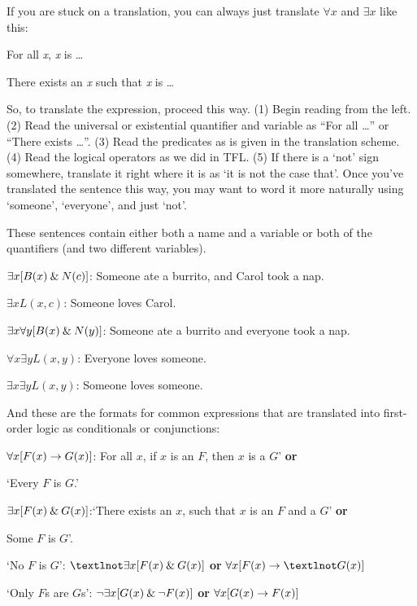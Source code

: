 If you are stuck on a translation, you can always just translate $\forall x$ and $\exists x$ like this:
\begin{ebullet}
\item[] For all \textit{x}, \textit{x} is \ldots
\item[] There exists an \textit{x} such that \textit{x} is \ldots
\end{ebullet} 
So, to translate the expression, proceed this way. (1) Begin reading from the left. (2) Read the universal or existential quantifier and variable as ``For all \ldots'' or ``There exists \ldots''. (3) Read the predicates as is given in the translation scheme. (4) Read the logical operators as we did in TFL. (5) If there is a `not' sign somewhere, translate it right where it is as `it is not the case that'. Once you've translated the sentence this way, you may want to word it more naturally using `someone', `everyone', and just `not'.

These sentences contain either both a name and a variable or both of the quantifiers (and two different variables).
\begin{ebullet}
	\item[]$\exists x[B(x) \mathbin{\&} N(c)]$: Someone ate a burrito, and Carol took a nap.\smallskip
	\item[]$\exists xL(x,c)$: Someone loves Carol.\smallskip
	\item[]$\exists x \forall y[B(x) \mathbin{\&} N(y)]$: Someone ate a burrito and everyone took a nap.\smallskip
	\item[]$\forall x \exists yL(x,y)$: Everyone loves someone.\smallskip
	\item[]$\exists x \exists yL(x,y)$: Someone loves someone.
\end{ebullet}
\noindent And these are the formats for common expressions that are translated into first-order logic as conditionals or conjunctions: 
\begin{ebullet}
\item[]$\forall x[F(x) \rightarrow G(x)]$: For all $x$, if $x$ is an $F$, then $x$ is a $G$’ \textbf{or}%
\item[]\hspace{29mm}`Every $F$ is $G$.’\smallskip
\item[]$\exists x[F(x) \mathbin{\&} G(x)]$:`There exists an $x$, such that $x$ is an $F$ and a $G$’ \textbf{or}%
\item[]\hspace{29mm} Some $F$ is $G$’.\smallskip
\item[]`No $F$ is $G$’: $¬\exists x[F(x) \eand G(x)] $ \textbf{or} $\forall x[F(x) \eif ¬G(x)]$\smallskip
\item[] ‘Only $F$s are $G$s’: ${\neg} \exists x[G(x) \mathbin{\&} {\neg} F(x)]$ \textbf{or} $\forall x[G(x) \rightarrow F(x)]$\smallskip
\end{ebullet}

